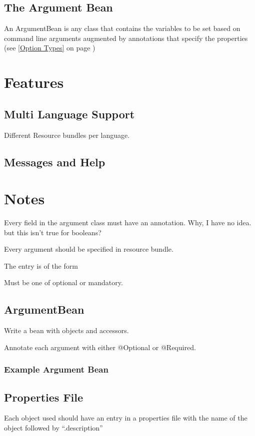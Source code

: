 \documentclass[a4paper,10pt]{article}
\begin{document}
\subsection{The Argument Bean}
An ArgumentBean is any class that contains the variables to be set based on command line arguments augmented by annotations
that specify the properties (see \ref{Option Types} on page \pageref{Option Types})

\section{Features}
\subsection{Multi Language Support}
Different Resource bundles per language.
\subsection{Messages and Help}
\section{Notes}
Every field in the argument class must have an annotation.  Why, I have no idea.
but this isn't true for booleans?

Every argument should be specified in resource bundle.  

The entry is of the form 

Must be one of optional or mandatory.

\subsection{ArgumentBean}
Write a bean with objects and accessors.

Annotate each argument with either @Optional or @Required.


\subsubsection{Example Argument Bean}

\subsection{Properties File}
Each object used should have an entry in a properties file with the name of the object 
followed by ``.description''
\end{document}
